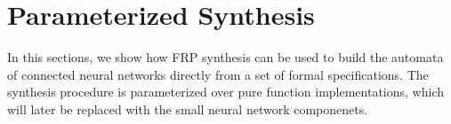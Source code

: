 \section{Parameterized Synthesis}

In this sections, we show how FRP synthesis can be used to build the automata of connected neural networks directly from a set of formal specifications.
The synthesis procedure is parameterized over pure function implementations, which will later be replaced with the small neural network componenets.
